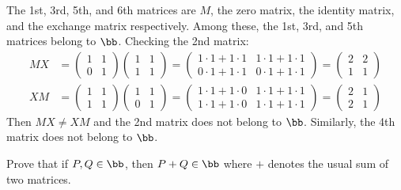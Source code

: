 \begin{sol}
    The 1st, 3rd, 5th, and 6th matrices are $M$, the zero matrix, the identity matrix, and the exchange matrix respectively. Among these, the 1st, 3rd, and 5th matrices belong to $\bb$. Checking the 2nd matrix:
    \begin{align*}
        MX & = 
        \begin{pmatrix}
            1 & 1 \\
            0 & 1
        \end{pmatrix}
        \begin{pmatrix}
            1 & 1 \\
            1 & 1
        \end{pmatrix} = 
        \begin{pmatrix}
            1 \cdot 1 + 1 \cdot 1 & 1 \cdot 1 + 1 \cdot 1 \\
            0 \cdot 1 + 1 \cdot 1 & 0 \cdot 1 + 1 \cdot 1
        \end{pmatrix} = 
        \begin{pmatrix}
            2 & 2 \\ 1 & 1
        \end{pmatrix} \\
        XM & = 
        \begin{pmatrix}
            1 & 1 \\
            1 & 1 
        \end{pmatrix}
        \begin{pmatrix}
            1 & 1 \\
            0 & 1
        \end{pmatrix} = 
        \begin{pmatrix}
            1 \cdot 1 + 1 \cdot 0 & 1 \cdot 1 + 1 \cdot 1 \\
            1 \cdot 1 + 1 \cdot 0 & 1 \cdot 1 + 1 \cdot 1 
        \end{pmatrix} =
        \begin{pmatrix}
            2 & 1 \\
            2 & 1
        \end{pmatrix}
    \end{align*}
    Then $MX \neq XM$ and the 2nd matrix does not belong to $\bb$. Similarly, the 4th matrix does not belong to $\bb$.
\end{sol}

\begin{exercise}\label{ex0.1.2}
    Prove that if $P, Q \in \bb$, then $P + Q \in \bb$ where $+$ denotes the usual sum of two matrices.
\end{exercise}

